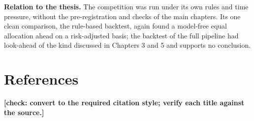 \documentclass[12pt,a4paper]{report}
\begin{document}
\textbf{Relation to the thesis.} The competition was run under its own
rules and time pressure, without the pre-registration and checks of the
main chapters. Its one clean comparison, the rule-based backtest, again
found a model-free equal allocation ahead on a risk-adjusted basis; the
backtest of the full pipeline had look-ahead of the kind discussed in
Chapters 3 and 5 and supports no conclusion.

\chapter*{References}\label{references}

\textbf{{[}check: convert to the required citation style; verify each
title against the source.{]}}
\end{document}
